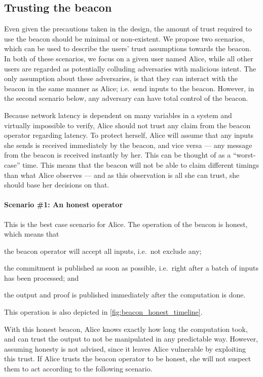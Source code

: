 \subsection{Trusting the beacon}%
\label{sub:trusting_the_beacon}

Even given the precautions taken in the design, the amount of trust required to use the beacon should be minimal or non-existent.
We propose two scenarios, which can be used to describe the users' trust assumptions towards the beacon.
In both of these scenarios, we focus on a given user named Alice, while all other users are regarded as potentially colluding adversaries with malicious intent.
The only assumption about these adversaries, is that they can interact with the beacon in the same manner as Alice; i.e.\ send inputs to the beacon.
However, in the second scenario below, any adversary can have total control of the beacon.

Because network latency is dependent on many variables in a system and virtually impossible to verify, Alice should not trust any claim from the beacon operator regarding latency.
To protect herself, Alice will assume that any inputs she sends is received immediately by the beacon, and vice versa --- any message from the beacon is received instantly by her. This can be thought of as a \enquote{worst-case} time.
This means that the beacon will not be able to claim different timings than what Alice observes --- and as this observation is all she can trust, she should base her decisions on that.

\paragraph{Scenario \#1: An honest operator}
This is the best case scenario for Alice.
The operation of the beacon is honest, which means that
\begin{eletterate*}
\item the beacon operator will accept all inputs, i.e.\ not exclude any;
\item the commitment is published as soon as possible, i.e.\ right after a batch of inputs has been processed; and
\item the output and proof is published immediately after the computation is done.
\end{eletterate*}
This operation is also depicted in \cref{fig:beacon_honest_timeline}.

With this honest beacon, Alice knows exactly how long the computation took, and can trust the output to not be manipulated in any predictable way.
However, assuming honesty is not advised, since it leaves Alice vulnerable by exploiting this trust.
If Alice trusts the beacon operator to be honest, she will not suspect them to act according to the following scenario.

